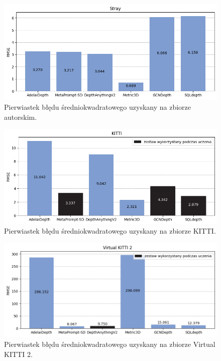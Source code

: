 \begin{figure}[H]
    \centering
    \includegraphics{plots/rmse/3}
    \caption{Pierwiastek błędu średniokwadratowego uzyskany na zbiorze autorskim.}
    \label{fig:rmse_3}
\end{figure}
\begin{figure}[H]
    \centering
    \includegraphics{plots/rmse/4}
    \caption{Pierwiastek błędu średniokwadratowego uzyskany na zbiorze KITTI.}
    \label{fig:rmse_4}
\end{figure}
\begin{figure}[H]
    \centering
    \includegraphics{plots/rmse/5}
    \caption{Pierwiastek błędu średniokwadratowego uzyskany na zbiorze Virtual KITTI 2.}
    \label{fig:rmse_5}
\end{figure}
